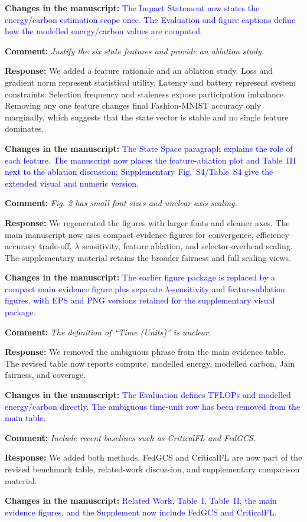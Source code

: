 \documentclass[11pt]{article}
\newcommand{\comment}[1]{\textbf{Comment:} \textit{#1}}
\newcommand{\response}[1]{\textbf{Response:} #1}
\newcommand{\change}[1]{\textbf{Changes in the manuscript:} \textcolor{blue}{#1}}
\begin{document}
\change{The Impact Statement now states the energy/carbon estimation scope once. The Evaluation and figure captions define how the modelled energy/carbon values are computed.}

\comment{Justify the six state features and provide an ablation study.}

\response{We added a feature rationale and an ablation study. Loss and gradient norm represent statistical utility. Latency and battery represent system constraints. Selection frequency and staleness expose participation imbalance. Removing any one feature changes final Fashion-MNIST accuracy only marginally, which suggests that the state vector is stable and no single feature dominates.}

\change{The State Space paragraph explains the role of each feature. The manuscript now places the feature-ablation plot and Table~III next to the ablation discussion; Supplementary Fig.~S4/Table~S4 give the extended visual and numeric version.}

\comment{Fig. 2 has small font sizes and unclear axis scaling.}

\response{We regenerated the figures with larger fonts and cleaner axes. The main manuscript now uses compact evidence figures for convergence, efficiency--accuracy trade-off, $\lambda$ sensitivity, feature ablation, and selector-overhead scaling. The supplementary material retains the broader fairness and full scaling views.}

\change{The earlier figure package is replaced by a compact main evidence figure plus separate $\lambda$-sensitivity and feature-ablation figures, with EPS and PNG versions retained for the supplementary visual package.}

\comment{The definition of ``Time (Units)'' is unclear.}

\response{We removed the ambiguous phrase from the main evidence table. The revised table now reports compute, modelled energy, modelled carbon, Jain fairness, and coverage.}

\change{The Evaluation defines TFLOPs and modelled energy/carbon directly. The ambiguous time-unit row has been removed from the main table.}

\comment{Include recent baselines such as CriticalFL and FedGCS.}

\response{We added both methods. FedGCS and CriticalFL are now part of the revised benchmark table, related-work discussion, and supplementary comparison material.}

\change{Related Work, Table~I, Table~II, the main evidence figures, and the Supplement now include FedGCS and CriticalFL.}
\end{document}
